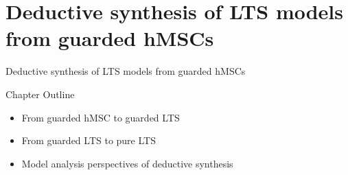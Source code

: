 \section{Deductive synthesis of LTS models from guarded hMSCs}

\begin{frame}{Deductive synthesis of LTS models from guarded hMSCs}
  \begin{block}{Chapter Outline}
    \begin{itemize}
      \item From guarded hMSC to guarded LTS
      \item From guarded LTS to pure LTS
      \item Model analysis perspectives of deductive synthesis
    \end{itemize}
  \end{block}
\end{frame}


